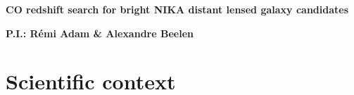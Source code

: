\documentclass[11pt,a4paper,twoside,graphicx,color]{article}
\begin{document}
%
%
\begin{center}{\LARGE \bf
CO redshift search for bright NIKA distant lensed galaxy candidates
}\end{center}
%
\centerline{\bf P.I.: R\'emi Adam \& Alexandre Beelen}



\section{Scientific context}
\end{document}
